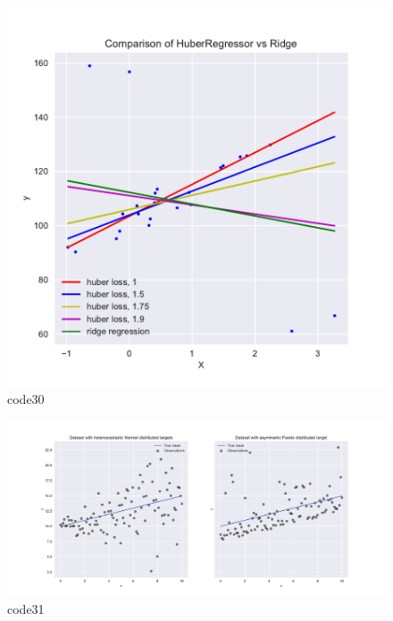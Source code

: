 \begin{PythonCode}\label{例23}
	
\end{PythonCode}

\begin{figure}[htbp]
	\centering
	\includegraphics[width=14cm]{codeimage/code30}
	\caption{code30}
	\label{code30}
\end{figure}

\begin{PythonCode}\label{例24}
	
\end{PythonCode}

\begin{figure}[htbp]
	\centering
	\includegraphics[width=14cm]{codeimage/code31}
	\caption{code31}
	\label{code31}
\end{figure}

